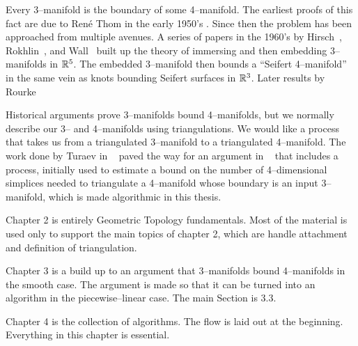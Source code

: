 Every 3--manifold is the boundary of some 4--manifold.
The earliest proofs of this fact are due to Ren\'e Thom in the early 1950's \cite{Thom}.
Since then the problem has been approached from multiple avenues.
A series of papers in the 1960's by Hirsch~\cite{Hirsch61}, Rokhlin~\cite{Rokhlin65}, and Wall~\cite{Wall65} built up the theory of immersing and then embedding 3--manifolds in $\mathbb{R}^5$.
The embedded 3--manifold then bounds a ``Seifert 4--manifold'' in the same vein as knots bounding  Seifert surfaces in $\mathbb{R}^3$.
Later results by Rourke~\cite{Rourke85}

Historical arguments prove 3--manifolds bound 4--manifolds, but we normally describe our 3-- and 4--manifolds using triangulations.
We would like a process that takes us from a triangulated 3--manifold to a triangulated 4--manifold.
The work done by Turaev in ~\cite{Turaev91} paved the way for an argument in ~\cite{CostThur08} that includes a process, initially used to estimate a bound on the number of 4--dimensional simplices needed to triangulate a 4--manifold whose boundary is an input 3--manifold, which is made algorithmic in this thesis.

Chapter 2 is entirely Geometric Topology fundamentals.  Most of the material is used only to support the main topics of chapter 2, which are handle attachment and definition of triangulation.

Chapter 3 is a build up to an argument that 3--manifolds bound 4--manifolds in the smooth case.  The argument is made so that it can be turned into an algorithm in the piecewise--linear case.  The main Section is 3.3.

Chapter 4 is the collection of algorithms.  The flow is laid out at the beginning.  Everything in this chapter is essential.